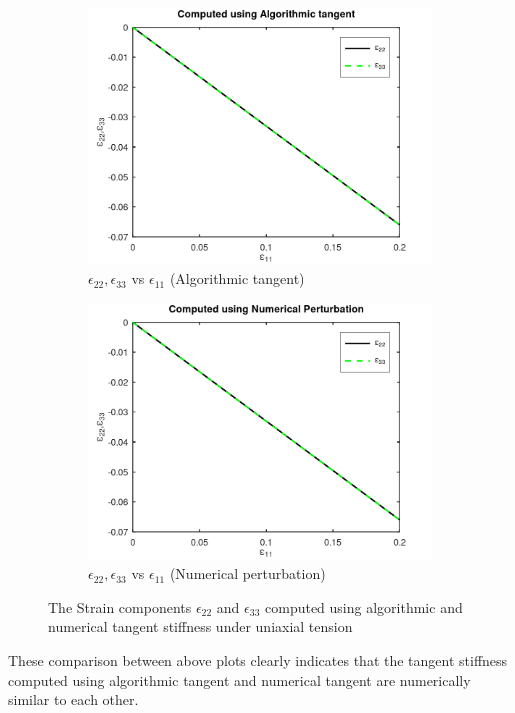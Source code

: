 \documentclass[a4paper,12pt]{extarticle}
\begin{document}
\begin{figure}[htbp]
     \centering
     \begin{subfigure}{0.4\textwidth}
         \centering
         \includegraphics[width=1.25\textwidth]{22.e11vse22e33_ATS.png}
         \caption{$\epsilon_{22},\epsilon_{33}$ vs $\epsilon_{11}$ (Algorithmic tangent)}
         \label{fig:Algorithmic tangent}
     \end{subfigure}  
     \hfill
     \begin{subfigure}{0.4\textwidth}
         \centering
         \includegraphics[width=1.25\textwidth]{22.e11vse22e33_NT.png}
         \caption{$\epsilon_{22},\epsilon_{33}$ vs $\epsilon_{11}$ (Numerical perturbation)}
         \label{fig:Numerical perturbation}
     \end{subfigure}
        \caption{The Strain components $\epsilon_{22}$ and $\epsilon_{33}$ computed using algorithmic and numerical tangent stiffness under uniaxial tension}
        \label{fig: Algorithmic and numerical tangent stiffness under uniaxial tension}     
\end{figure}
These comparison between above plots clearly indicates that the tangent stiffness computed using algorithmic tangent and numerical tangent are numerically similar to each other.
\end{document}
